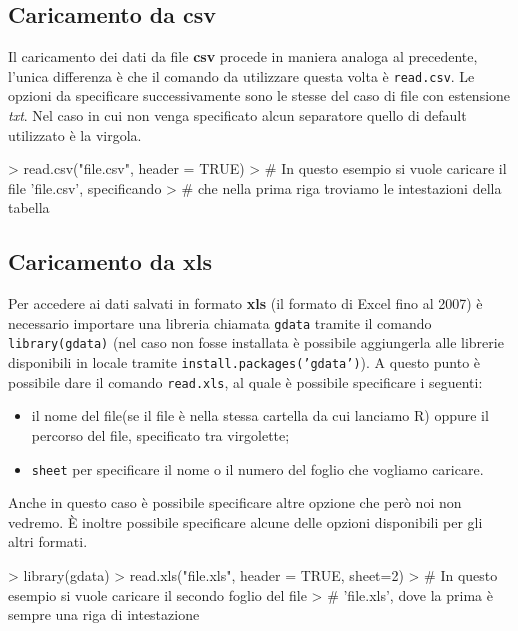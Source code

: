 \documentclass{article}
\begin{document}
\subsection{Caricamento da csv}
Il caricamento dei dati da file \textbf{csv} procede in maniera analoga al 
precedente, l'unica differenza è che il comando da utilizzare questa volta è
\texttt{read.csv}. Le opzioni da specificare successivamente sono le stesse
del caso di file con estensione \emph{txt}. Nel caso in cui non venga 
specificato alcun separatore quello di default utilizzato è la virgola.
\begin{Schunk}
\begin{Sinput}
> read.csv("file.csv", header = TRUE)
> # In questo esempio si vuole caricare il file 'file.csv', specificando 
> # che nella prima riga troviamo le intestazioni della tabella
\end{Sinput}
\end{Schunk}

\subsection{Caricamento da xls}
Per accedere ai dati salvati in formato \textbf{xls} (il formato di Excel 
fino al 2007) è necessario importare una libreria chiamata \texttt{gdata}
tramite il comando \texttt{library(gdata)} (nel caso non fosse installata
è possibile aggiungerla alle librerie disponibili in locale tramite 
\texttt{install.packages('gdata')}). A questo punto è possibile dare il 
comando \texttt{read.xls}, al quale è possibile specificare i seguenti:
\begin{itemize}
  \item il nome del file(se il file è nella stessa cartella da cui lanciamo R)
  oppure il percorso del file, specificato tra virgolette;
  \item \texttt{sheet} per specificare il nome o il numero del foglio che 
  vogliamo caricare.
\end{itemize}
Anche in questo caso è possibile specificare altre opzione che però noi non 
vedremo. È inoltre possibile specificare alcune delle opzioni disponibili per 
gli altri formati.
\begin{Schunk}
\begin{Sinput}
> library(gdata)
> read.xls("file.xls", header = TRUE, sheet=2)
> # In questo esempio si vuole caricare il secondo foglio del file 
> # 'file.xls', dove la prima è sempre una riga di intestazione
\end{Sinput}
\end{Schunk}
\end{document}
